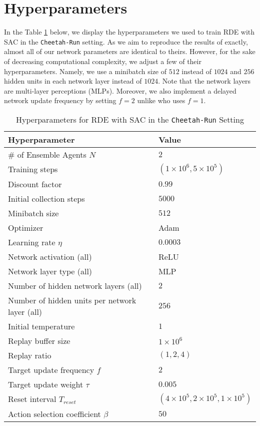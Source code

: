 \documentclass[base]{subfiles}
\begin{document}
\section{Hyperparameters}\label{app:b}

In the Table \ref{tab:cheetah_hyp} below, we display the hyperparameters we used to train RDE with SAC in the \texttt{Cheetah-Run} setting. 
As we aim to reproduce the results of \cite{kim2023} exactly, almost all of our network parameters are identical to theirs.
However, for the sake of decreasing computational complexity, we adjust a few of their hyperparameters.
Namely, we use a minibatch size of $512$ instead of $1024$ and $256$ hidden units in each network layer instead of $1024$.
Note that the network layers are multi-layer perceptions (MLPs).
Moreover, we also implement a delayed network update frequency by setting $f=2$ unlike \cite{kim2023} who uses $f=1$.

\begin{table}[h]
    \caption{Hyperparameters for RDE with SAC in the \texttt{Cheetah-Run} Setting}
    \label{tab:cheetah_hyp}
    \centering
    \begin{tabular}{l|l}
        \toprule
         Hyperparameter & Value \\
         \hline
         \# of Ensemble Agents $N$ & $2$ \\
         Training steps & $(1 \times 10^6, 5 \times 10^5)$ \\
         Discount factor & $0.99$ \\
         Initial collection steps & $5000$ \\
         Minibatch size & $512$ \\
         Optimizer & Adam \\
         Learning rate $\eta$ & $0.0003$ \\
         Network activation (all) & ReLU \\
         Network layer type (all) & MLP \\
         Number of hidden network layers (all) & $2$ \\
         Number of hidden units per network layer (all) & $256$ \\
         Initial temperature & $1$ \\
         Replay buffer size & $1 \times 10^6$ \\
         Replay ratio & $(1,2,4)$ \\
         Target update frequency $f$ & $2$ \\
         Target update weight $\tau$ & $0.005$ \\
         Reset interval $T_{reset}$ & $(4 \times 10^5, 2 \times 10^5, 1 \times 10^5)$ \\
         Action selection coefficient $\beta$ & $50$ \\
         \bottomrule
    \end{tabular}
\end{table}
\end{document}
